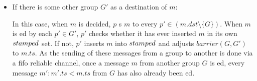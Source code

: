 \documentclass[times, 10pt]{article}
\begin{document}
\begin{itemize}
\begin{itemize}
    \item If there is some other group $G'$ as a destination of $m$:
    
    In this case, when $m$ is decided, $p$ \rmcast{}s $m$ to every \mbox{$p' \in (m.dst \setminus \{G\})$}. When $m$ is \rmdel{}ed by each $p' \in G'$, $p'$ checks whether it has ever inserted $m$ in its own $stamped$ set. If not, $p'$ inserts $m$ into $stamped$ and adjusts $barrier(G, G')$ to $m.ts$. As the sending of these messages from a group to another is done via a fifo reliable channel, once a message $m$ from another group $G$ is \rmdel{}ed, every message $m' : m'.ts < m.ts$ from $G$ has also already been \rmdel{}ed.
    
  \end{itemize}
%   
% 
%   

\end{itemize}
\end{document}
